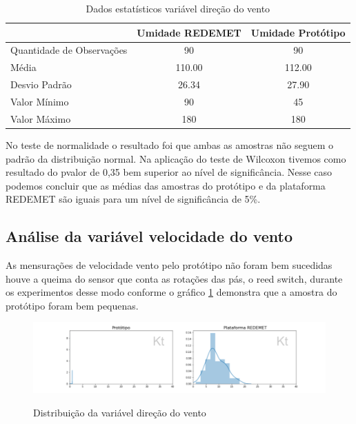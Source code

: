 \begin{table}[!h]
\centering
\begin{tabular}{l|c|c|}
\cline{2-3}
                                                & \multicolumn{1}{l|}{\textbf{Umidade REDEMET}} & \textbf{Umidade Protótipo} \\ \hline
\multicolumn{1}{|l|}{Quantidade de Observações} & 90                                            & 90                         \\ \hline
\multicolumn{1}{|l|}{Média}                     & 110.00                                        & 112.00                     \\ \hline
\multicolumn{1}{|l|}{Desvio Padrão}             & 26.34                                         & 27.90                      \\ \hline
\multicolumn{1}{|l|}{Valor Mínimo}              & 90                                            & 45                         \\ \hline
\multicolumn{1}{|l|}{Valor Máximo}              & 180                                           & 180                        \\ \hline
\end{tabular}
\caption{Dados estatísticos variável direção do vento}
\label{tab:est_desc_dirvento_prot}
\end{table}

No teste de normalidade o resultado foi que ambas as amostras não seguem o padrão da distribuição normal. Na aplicação do teste de Wilcoxon tivemos como resultado do pvalor de 0,35 bem superior ao nível de significância. Nesse caso podemos concluir que as médias das amostras do protótipo e da plataforma REDEMET são iguais para um nível de significância de 5\%.


\subsection{Análise da variável velocidade do vento}

As mensurações de velocidade vento pelo protótipo não foram bem sucedidas houve a queima do sensor que conta as rotações das pás, o reed switch, durante os experimentos desse modo conforme o gráfico \ref{fig:dist_velvento} demonstra que a amostra do protótipo foram bem pequenas. 

\begin{figure} [!h]
    \centering
    \caption{Distribuição da variável direção do vento}    \includegraphics [scale = 0.5] {Figuras/dist_velvento.png}
    \label{fig:dist_velvento}
\end{figure}


